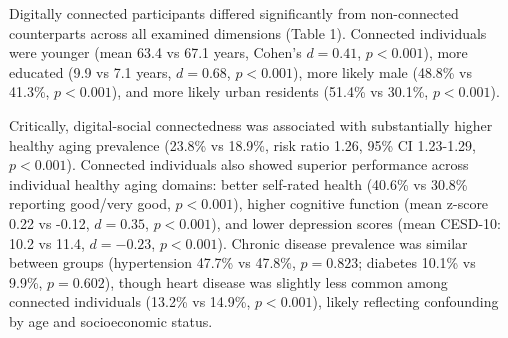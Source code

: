 \documentclass[10pt]{article}
\begin{document}
Digitally connected participants differed significantly from non-connected counterparts across all examined dimensions (Table 1). Connected individuals were younger (mean 63.4 vs 67.1 years, Cohen's $d=0.41$, $p<0.001$), more educated (9.9 vs 7.1 years, $d=0.68$, $p<0.001$), more likely male (48.8\% vs 41.3\%, $p<0.001$), and more likely urban residents (51.4\% vs 30.1\%, $p<0.001$).

Critically, digital-social connectedness was associated with substantially higher healthy aging prevalence (23.8\% vs 18.9\%, risk ratio 1.26, 95\% CI 1.23-1.29, $p<0.001$). Connected individuals also showed superior performance across individual healthy aging domains: better self-rated health (40.6\% vs 30.8\% reporting good/very good, $p<0.001$), higher cognitive function (mean z-score 0.22 vs -0.12, $d=0.35$, $p<0.001$), and lower depression scores (mean CESD-10: 10.2 vs 11.4, $d=-0.23$, $p<0.001$). Chronic disease prevalence was similar between groups (hypertension 47.7\% vs 47.8\%, $p=0.823$; diabetes 10.1\% vs 9.9\%, $p=0.602$), though heart disease was slightly less common among connected individuals (13.2\% vs 14.9\%, $p<0.001$), likely reflecting confounding by age and socioeconomic status.
\end{document}
